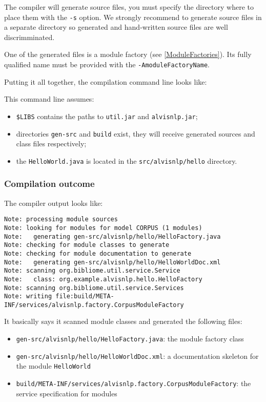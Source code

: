 \documentclass[a4paper]{article}
\begin{document}
The compiler will generate source files, you must specify the directory where to place them with the \texttt{-s} option.
We strongly recommend to generate source files in a separate directory so generated and hand-written source files are well discrimminated.

One of the generated files is a module factory (see \ref{ModuleFactories}).
Its fully qualified name must be provided with the \texttt{-AmoduleFactoryName}.

Putting it all together, the compilation command line looks like:


This command line assumes:
\begin{itemize}
\item \texttt{\$LIBS} contains the paths to \texttt{util.jar} and \texttt{alvisnlp.jar};
\item directories \texttt{gen-src} and \texttt{build} exist, they will receive generated sources and class files respectively;
\item the \texttt{HelloWorld.java} is located in the \texttt{src/alvisnlp/hello} directory.
\end{itemize}

\subsubsection{Compilation outcome}
The compiler output looks like:
\begin{verbatim}
Note: processing module sources
Note: looking for modules for model CORPUS (1 modules)
Note:   generating gen-src/alvisnlp/hello/HelloFactory.java
Note: checking for module classes to generate
Note: checking for module documentation to generate
Note:   generating gen-src/alvisnlp/hello/HelloWorldDoc.xml
Note: scanning org.bibliome.util.service.Service
Note:   class: org.example.alvisnlp.hello.HelloFactory
Note: scanning org.bibliome.util.service.Services
Note: writing file:build/META-INF/services/alvisnlp.factory.CorpusModuleFactory
\end{verbatim}

It basically says it scanned module classes and generated the following files:
\begin{itemize}
\item \texttt{gen-src/alvisnlp/hello/HelloFactory.java}: the module factory class
\item \texttt{gen-src/alvisnlp/hello/HelloWorldDoc.xml}: a documentation skeleton for the module \texttt{HelloWorld}
\item \texttt{build/META-INF/services/alvisnlp.factory.CorpusModuleFactory}: the service specification for modules
\end{itemize}
\end{document}
